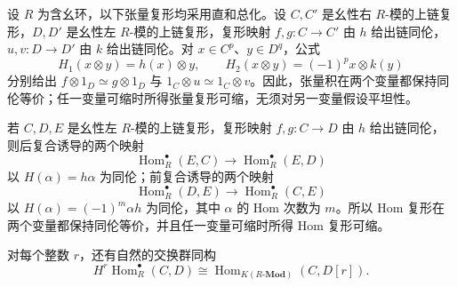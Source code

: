 \begin{proposition}\label{b4:prop:tensor-hom-preserve-homotopy}
	设 \(R\) 为含幺环，以下张量复形均采用直和总化。设 \(C,C'\) 是幺性右 \(R\)-模的上链复形，\(D,D'\) 是幺性左 \(R\)-模的上链复形，复形映射 \(f,g:C\to C'\) 由 \(h\) 给出链同伦，\(u,v:D\to D'\) 由 \(k\) 给出链同伦。对 \(x\in C^p\)、\(y\in D^q\)，公式
	\[
		H_1(x\otimes y)=h(x)\otimes y,\qquad H_2(x\otimes y)=(-1)^p x\otimes k(y)
	\]
	分别给出 \(f\otimes1_D\simeq g\otimes1_D\) 与 \(1_C\otimes u\simeq1_C\otimes v\)。因此，张量积在两个变量都保持同伦等价；任一变量可缩时所得张量复形可缩，无须对另一变量假设平坦性。

	若 \(C,D,E\) 是幺性左 \(R\)-模的上链复形，复形映射 \(f,g:C\to D\) 由 \(h\) 给出链同伦，则后复合诱导的两个映射
	\[
		\operatorname{Hom}_R^\bullet(E,C)\longrightarrow \operatorname{Hom}_R^\bullet(E,D)
	\]
	以 \(H(\alpha)=h\alpha\) 为同伦；前复合诱导的两个映射
	\[
		\operatorname{Hom}_R^\bullet(D,E)\longrightarrow \operatorname{Hom}_R^\bullet(C,E)
	\]
	以 \(H(\alpha)=(-1)^m\alpha h\) 为同伦，其中 \(\alpha\) 的 Hom 次数为 \(m\)。所以 Hom 复形在两个变量都保持同伦等价，并且任一变量可缩时所得 Hom 复形可缩。

	对每个整数 \(r\)，还有自然的交换群同构
	\[
		H^r\operatorname{Hom}_R^\bullet(C,D) \cong\operatorname{Hom}_{K(R\text{-}\mathbf{Mod})}(C,D[r]).
	\]
\end{proposition}
